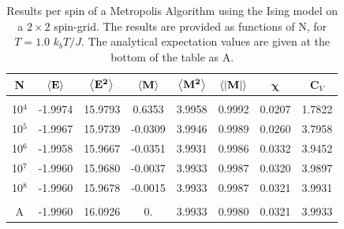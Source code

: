 \documentclass[%
reprint,nofootinbib,
amsmath,amssymb,
aps,
]{revtex4-1}
\begin{document}
\begin{table}[H]
	\caption{\label{2b}Results per spin of a Metropolis Algorithm using the Ising model on a $2\times 2$ spin-grid. The results are provided as functions of N, for $T = 1.0$ $k_bT/J$. The analytical expectation values are given at the bottom of the table as A.}
	\begin{tabular}{|c|c|c|c|c|c|c|c|} \hline 
		\textbf{N}  & \hspace{1mm}	$\expval{\mathbf{E}}$ \hspace{1mm} & \hspace{1mm}$\expval{\mathbf{E^2}}$ \hspace{1mm} & \hspace{1mm}	$\expval{\mathbf{M}}$\hspace{1mm}  &	\hspace{1mm} $\expval{\mathbf{M^2}}$ \hspace{1mm}  &	\hspace{1mm}$\expval{\abs{\mathbf{M}}} $\hspace{1mm} & \hspace{2mm}$\mathbf{\chi}$	\hspace{2mm} & \hspace{2mm}	\textbf{C}$_V$\hspace{2mm} \\ \hline 
		&&&&&&&\\
		10$^4$   &  -1.9974   & 15.9793  &  0.6353 &   3.9958 &   0.9992&   0.0207 &   1.7822\\
		10$^5$    &          -1.9967   & 15.9739  &  -0.0309 &   3.9946 &   0.9989&   0.0260 &   3.7958\\ 
		
		10$^6$  &          -1.9958   & 15.9667  &  -0.0351 &   3.9931 &   0.9986&   0.0332 &   3.9452\\ 
		
		10$^7$  &          -1.9960   & 15.9680  &  -0.0037 &   3.9933 &   0.9987&   0.0320 &   3.9897\\ 
		10$^8$   &          -1.9960   & 15.9678  &  -0.0015 &   3.9933 &   0.9987&   0.0321 &   3.9931\\ 
		&&&&&&&\\ \hline 
		A &-1.9960 & 16.0926  &0.    &  3.9933 & 0.9980  & 0.0321&  3.9933 \\ \hline 
	\end{tabular}
\end{table} \newpage 
\end{document}
